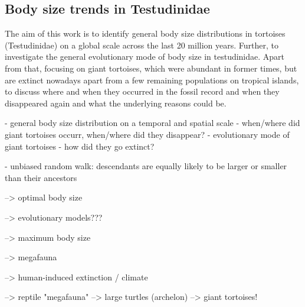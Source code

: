 \subsection{Body size trends in Testudinidae}

The aim of this work is to identify general body size distributions in tortoises (Testudinidae) on a global scale across the last 20 million years. Further, to investigate the general evolutionary mode of body size in testudinidae. Apart from that, focusing on giant tortoises, which were abundant in former times, but are extinct nowadays apart from a few remaining populations on tropical islands, to discuss where and when they occurred in the fossil record and when they disappeared again and what the underlying reasons could be.

- general body size distribution on a temporal and spatial scale
- when/where did giant tortoises occurr, when/where did they disappear?
- evolutionary mode of giant tortoises
- how did they go extinct?


- unbiased random walk: descendants are equally likely to be larger or smaller than their ancestors











































\vspace{3 cm}


--> optimal body size

--> evolutionary models???

--> maximum body size 

--> megafauna 

--> human-induced extinction / climate

--> reptile "megafauna" --> large turtles (archelon) --> giant tortoises!

